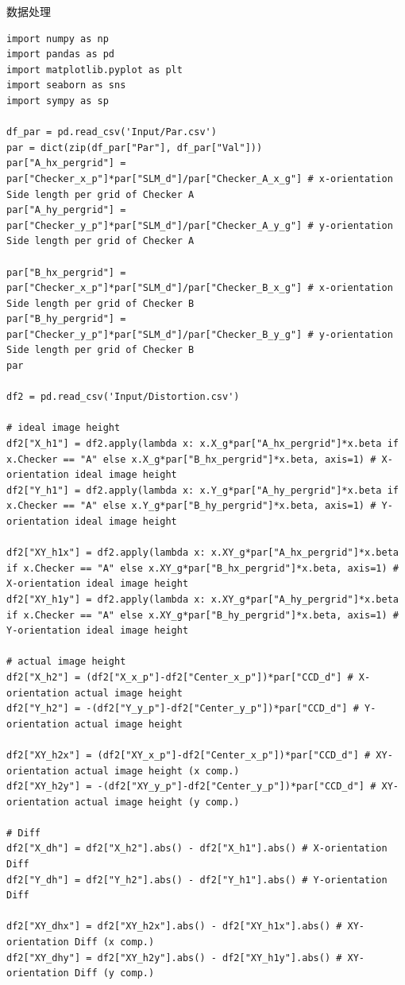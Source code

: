 \documentclass[10pt,a4paper,twoside,UTF8]{ctexart}
\begin{document}
数据处理
\begin{lstlisting}
import numpy as np 
import pandas as pd
import matplotlib.pyplot as plt
import seaborn as sns
import sympy as sp

df_par = pd.read_csv('Input/Par.csv')
par = dict(zip(df_par["Par"], df_par["Val"]))
par["A_hx_pergrid"] = par["Checker_x_p"]*par["SLM_d"]/par["Checker_A_x_g"] # x-orientation Side length per grid of Checker A
par["A_hy_pergrid"] = par["Checker_y_p"]*par["SLM_d"]/par["Checker_A_y_g"] # y-orientation Side length per grid of Checker A

par["B_hx_pergrid"] = par["Checker_x_p"]*par["SLM_d"]/par["Checker_B_x_g"] # x-orientation Side length per grid of Checker B
par["B_hy_pergrid"] = par["Checker_y_p"]*par["SLM_d"]/par["Checker_B_y_g"] # y-orientation Side length per grid of Checker B
par

df2 = pd.read_csv('Input/Distortion.csv')

# ideal image height 
df2["X_h1"] = df2.apply(lambda x: x.X_g*par["A_hx_pergrid"]*x.beta if x.Checker == "A" else x.X_g*par["B_hx_pergrid"]*x.beta, axis=1) # X-orientation ideal image height 
df2["Y_h1"] = df2.apply(lambda x: x.Y_g*par["A_hy_pergrid"]*x.beta if x.Checker == "A" else x.Y_g*par["B_hy_pergrid"]*x.beta, axis=1) # Y-orientation ideal image height

df2["XY_h1x"] = df2.apply(lambda x: x.XY_g*par["A_hx_pergrid"]*x.beta if x.Checker == "A" else x.XY_g*par["B_hx_pergrid"]*x.beta, axis=1) # X-orientation ideal image height 
df2["XY_h1y"] = df2.apply(lambda x: x.XY_g*par["A_hy_pergrid"]*x.beta if x.Checker == "A" else x.XY_g*par["B_hy_pergrid"]*x.beta, axis=1) # Y-orientation ideal image height

# actual image height
df2["X_h2"] = (df2["X_x_p"]-df2["Center_x_p"])*par["CCD_d"] # X-orientation actual image height 
df2["Y_h2"] = -(df2["Y_y_p"]-df2["Center_y_p"])*par["CCD_d"] # Y-orientation actual image height

df2["XY_h2x"] = (df2["XY_x_p"]-df2["Center_x_p"])*par["CCD_d"] # XY-orientation actual image height (x comp.)
df2["XY_h2y"] = -(df2["XY_y_p"]-df2["Center_y_p"])*par["CCD_d"] # XY-orientation actual image height (y comp.)

# Diff
df2["X_dh"] = df2["X_h2"].abs() - df2["X_h1"].abs() # X-orientation Diff 
df2["Y_dh"] = df2["Y_h2"].abs() - df2["Y_h1"].abs() # Y-orientation Diff

df2["XY_dhx"] = df2["XY_h2x"].abs() - df2["XY_h1x"].abs() # XY-orientation Diff (x comp.)
df2["XY_dhy"] = df2["XY_h2y"].abs() - df2["XY_h1y"].abs() # XY-orientation Diff (y comp.)


\end{lstlisting}
\end{document}
